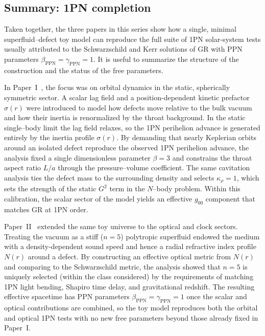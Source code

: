 \documentclass[11pt]{article}
\begin{document}
\subsection{Summary: 1PN completion}
\label{subsec:discussion-summary}

Taken together, the three papers in this series show how a single,
minimal superfluid--defect toy model can reproduce the full suite of
1PN solar-system tests usually attributed to the Schwarzschild and
Kerr solutions of GR with PPN parameters
$\beta_{\mathrm{PPN}}=\gamma_{\mathrm{PPN}}=1$.
It is useful to summarize the structure of the construction and the
status of the free parameters.

In Paper~I~\cite{Norris:2025Orbits}, the focus was on orbital dynamics in
the static, spherically symmetric sector.
A scalar lag field and a position-dependent kinetic prefactor
$\sigma(r)$ were introduced to model how defects move relative to the
bulk vacuum and how their inertia is renormalized by the throat
background.
In the static single–body limit the lag field relaxes, so the 1PN
perihelion advance is generated entirely by the inertia profile
$\sigma(r)$.
By demanding that nearly Keplerian orbits around an isolated defect
reproduce the observed 1PN perihelion advance, the analysis fixed a
single dimensionless parameter $\beta=3$ and constrains the throat
aspect ratio $L/a$ through the pressure--volume coefficient.
The same cavitation analysis ties the defect mass to the surrounding
density and selects $\kappa_\rho=1$, which sets the strength of the
static $G^2$ term in the $N$--body problem.
Within this calibration, the scalar sector of the model yields an
effective $g_{00}$ component that matches GR at 1PN order.

Paper~II~\cite{Norris:Paper2} extended the same toy universe to the
optical and clock sectors.
Treating the vacuum as a stiff ($n=5$) polytropic superfluid endowed
the medium with a density-dependent sound speed and hence a radial
refractive index profile $N(r)$ around a defect.
By constructing an effective optical metric from $N(r)$ and comparing
to the Schwarzschild metric, the analysis showed that $n=5$ is
uniquely selected (within the class considered) by the requirements
of matching 1PN light bending, Shapiro time delay, and gravitational
redshift.
The resulting effective spacetime has PPN parameters
$\beta_{\mathrm{PPN}}=\gamma_{\mathrm{PPN}}=1$
once the scalar and optical contributions are combined, so the toy
model reproduces both the orbital and optical 1PN tests with no new
free parameters beyond those already fixed in Paper~I.
\end{document}
